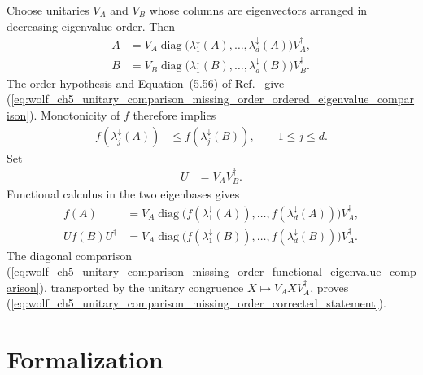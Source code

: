 \documentclass{article}
\begin{document}
Choose unitaries $V_A$ and $V_B$ whose columns are eigenvectors arranged in
decreasing eigenvalue order. Then
\begin{align}
    A
        &=V_A\operatorname{diag}\bigl(        \lambda_1^\downarrow(A),\ldots,
            \lambda_d^\downarrow(A)
        \bigr)V_A^\dagger,
    \label{eq:wolf_ch5_unitary_comparison_missing_order_A_diagonalization}\\
    B
        &=V_B\operatorname{diag}\bigl(        \lambda_1^\downarrow(B),\ldots,
            \lambda_d^\downarrow(B)
        \bigr)V_B^\dagger.
    \label{eq:wolf_ch5_unitary_comparison_missing_order_B_diagonalization}
\end{align}
The order hypothesis and Equation~(5.56) of
Ref.~\cite{Wolf2012Quantum} give
(\ref{eq:wolf_ch5_unitary_comparison_missing_order_ordered_eigenvalue_comparison}).
Monotonicity of $f$ therefore implies
\begin{align}
    f(\lambda_j^\downarrow(A))
        &\leq f(\lambda_j^\downarrow(B)),
        \qquad 1\leq j\leq d.
    \label{eq:wolf_ch5_unitary_comparison_missing_order_functional_eigenvalue_comparison}
\end{align}
Set
\begin{align}
    U
        &=V_A V_B^\dagger.
    \label{eq:wolf_ch5_unitary_comparison_missing_order_eigenbasis_unitary}
\end{align}
Functional calculus in the two eigenbases gives
\begin{align}
    f(A)
        &=V_A\operatorname{diag}\bigl(        f(\lambda_1^\downarrow(A)),\ldots,
            f(\lambda_d^\downarrow(A))
        \bigr)V_A^\dagger,
    \label{eq:wolf_ch5_unitary_comparison_missing_order_functional_calculus_A}\\
    U f(B)U^\dagger
        &=V_A\operatorname{diag}\bigl(        f(\lambda_1^\downarrow(B)),\ldots,
            f(\lambda_d^\downarrow(B))
        \bigr)V_A^\dagger.
    \label{eq:wolf_ch5_unitary_comparison_missing_order_functional_calculus_B}
\end{align}
The diagonal comparison
(\ref{eq:wolf_ch5_unitary_comparison_missing_order_functional_eigenvalue_comparison}),
transported by the unitary congruence $X\mapsto V_AXV_A^\dagger$, proves
(\ref{eq:wolf_ch5_unitary_comparison_missing_order_corrected_statement}).

\section{Formalization}
\end{document}

